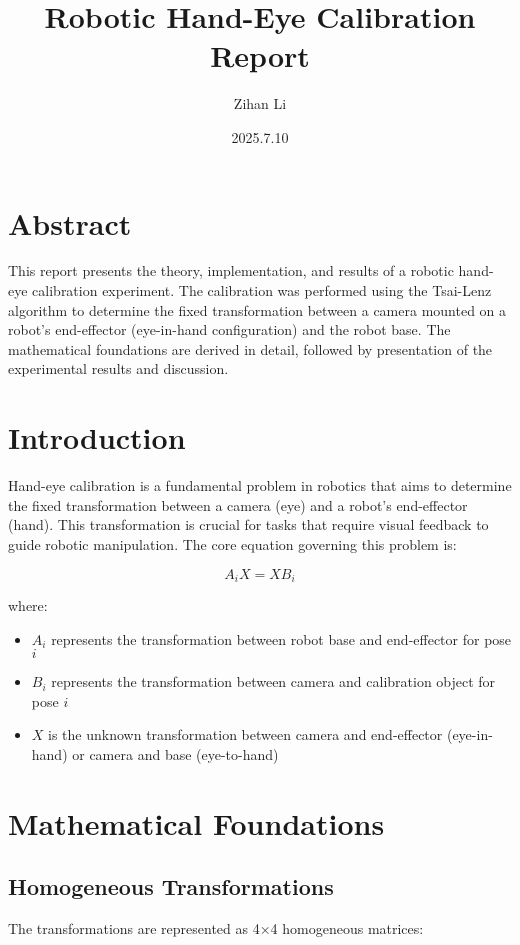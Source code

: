 \documentclass{article}
\title{Robotic Hand-Eye Calibration Report}
\author{Zihan Li}
\date{2025.7.10}
\begin{document}
\maketitle

\section{Abstract}
This report presents the theory, implementation, and results of a robotic hand-eye calibration experiment. The calibration was performed using the Tsai-Lenz algorithm to determine the fixed transformation between a camera mounted on a robot's end-effector (eye-in-hand configuration) and the robot base. The mathematical foundations are derived in detail, followed by presentation of the experimental results and discussion.

\section{Introduction}
Hand-eye calibration is a fundamental problem in robotics that aims to determine the fixed transformation between a camera (eye) and a robot's end-effector (hand). This transformation is crucial for tasks that require visual feedback to guide robotic manipulation. The core equation governing this problem is:

\begin{equation}
A_i X = X B_i
\end{equation}

where:
\begin{itemize}
\item $A_i$ represents the transformation between robot base and end-effector for pose $i$
\item $B_i$ represents the transformation between camera and calibration object for pose $i$
\item $X$ is the unknown transformation between camera and end-effector (eye-in-hand) or camera and base (eye-to-hand)
\end{itemize}

\section{Mathematical Foundations}

\subsection{Homogeneous Transformations}
The transformations are represented as 4×4 homogeneous matrices:
\end{document}
